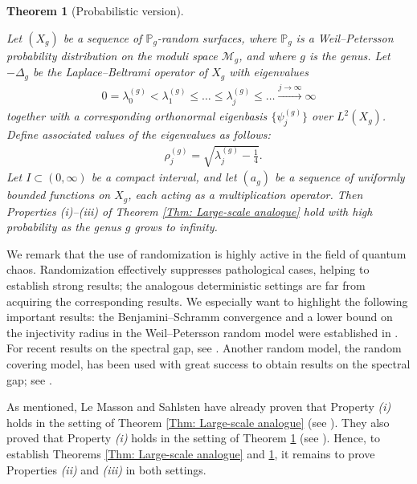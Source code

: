 \documentclass[11pt,twoside,reqno]{amsart} \usepackage{a4wide} \usepackage[T1]{fontenc} \usepackage[utf8]{inputenc} \usepackage{soul}  \usepackage{amsmath} \usepackage{amsfonts} \usepackage{amssymb} \usepackage{mathtools} \usepackage{amsthm} \usepackage{xcolor} \usepackage{graphicx} \usepackage{hyperref} \usepackage{standalone} \usepackage{esint} \usepackage{comment} \usepackage[left=2.3cm,top=3cm,right=2.3cm]{geometry} \usepackage{bm} \usepackage{svg} \usepackage{float} \numberwithin{equation}{section} \theoremstyle{plain} \newtheorem{thm}{Theorem}[section] \newtheorem{theorem}[thm]{Theorem} \newtheorem*{theorem*}{Theorem}\newtheorem{conj}[thm]{Conjecture} \newtheorem{lemma}[thm]{Lemma} \newtheorem{prop}[thm]{Proposition} \newtheorem{proposition}[thm]{Proposition} \newtheorem{cor}[thm]{Corollary} \newtheorem{question}[thm]{Question} \newtheorem{corollary}[thm]{Corollary} \newtheorem{assumption}[thm]{Assumption} \theoremstyle{definition} \newtheorem{defn}[thm]{Definition} \newtheorem{choice}[thm]{Choice} \newtheorem{definition}[thm]{Definition} \newtheorem{ex}[thm]{Example} \newtheorem{notation}[thm]{Notation} \newtheorem*{ack}{Acknowledgements} \theoremstyle{remark} \newtheorem{remark}[thm]{Remark} \newtheorem{bigremark}[thm]{Remark} \usepackage{xcolor} \newcommand{\red}[1]{ {\color{Red}#1} } \newcommand{\blue}[1]{ {\color{Blue}#1} } \author{Kai Hippi} \address{Aalto University, Espoo, Finland} \email{kai.hippi@aalto.fi}
\begin{document}
\begin{theorem}[Probabilistic version]
	\label{Thm: Probabilistic main theorem}

	Let $ ( X_{g} ) $ be a sequence of $ \mathbb{P}_{g} $-random surfaces, where $ \mathbb{P}_{g} $ is a Weil--Petersson probability distribution on the moduli space $ \mathcal{M}_{g} $, and where $ g $ is the genus. Let $-\Delta_{g}$ be the Laplace--Beltrami operator of $ X_{g} $ with eigenvalues 
	\begin{align*}
		0 = \lambda_{0}^{( g )} < \lambda_{1}^{( g )} \leq \dots \leq \lambda_{j}^{( g )} \leq \dots \xrightarrow{j \to \infty} \infty
	\end{align*}
	together with a corresponding orthonormal eigenbasis $ \{ \psi_{j}^{( g )} \} $ over $ L^{2}( X_{g} ) $. Define associated values of the eigenvalues as follows:
	\begin{align*}
		&
		\rho_{j}^{( g )} = \sqrt{ \lambda_{j}^{( g )} - \tfrac{1}{4} }.
	\end{align*}
	Let $ I \subset ( 0,\infty ) $ be a compact interval, and let $ ( a_{g} ) $ be a sequence of uniformly bounded functions on $ X_{g} $, each acting as a multiplication operator. Then Properties \emph{(i)}--\emph{(iii)} of Theorem \ref{Thm: Large-scale analogue} hold with high probability as the genus $ g $ grows to infinity.
	
\end{theorem}

We remark that the use of randomization is highly active in the field of quantum chaos. Randomization effectively suppresses pathological cases, helping to establish strong results; the analogous deterministic settings are far from acquiring the corresponding results. We especially want to highlight the following important results: the Benjamini--Schramm convergence and a lower bound on the injectivity radius in the Weil--Petersson random model were established in \cite{Mir13, Mon21}. For recent results on the spectral gap, see \cite{AM24, LW24, Mag24, HMT25, HMN25, WX25}. Another random model, the random covering model, has been used with great success to obtain results on the spectral gap; see \cite{MN20, MNP22, HM23}.


As mentioned, Le Masson and Sahlsten have already proven that Property \emph{(i)} holds in the setting of Theorem \ref{Thm: Large-scale analogue} (see \cite{LS17}). They also proved that Property \emph{(i)} holds in the setting of Theorem \ref{Thm: Probabilistic main theorem} (see \cite{LS24}). Hence, to establish Theorems \ref{Thm: Large-scale analogue} and \ref{Thm: Probabilistic main theorem}, it remains to prove Properties \emph{(ii)} and \emph{(iii)} in both settings. 
\end{document}
